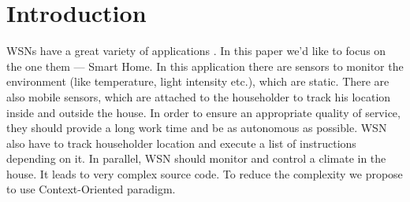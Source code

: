 \documentclass{ubicomp-ext}
\begin{document}
\begin{abstract}
\end{abstract}
\section{Introduction}
WSNs have a great variety of applications \cite{pastor08}. In this paper we'd like to focus on the one them --- Smart Home. In this application there are sensors to monitor the environment (like temperature, light intensity etc.), which are static. There are also mobile sensors, which are attached to the householder to track his location inside and outside the house. In order to ensure an appropriate quality of service, they should provide a long work time and be as autonomous as possible. WSN also have to track householder location and execute a list of instructions depending on it. In parallel, WSN should monitor and control a climate in the house. It leads to very complex source code. To reduce the complexity we propose to use Context-Oriented paradigm.
\end{document}
